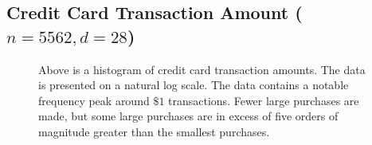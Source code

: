 \documentclass[smallextended,final]{svjour3}       %
\begin{document}
\subsection{Credit Card Transaction Amount ($n = 5562, d = 28$)}

\begin{figure}
  \centering
  \caption{Above is a histogram of credit card transaction
    amounts. The data is presented on a natural log scale. The data
    contains a notable frequency peak around $\$1$ transactions. Fewer
    large purchases are made, but some large purchases are in excess
    of five orders of magnitude greater than the smallest purchases.}
  \label{fig:hist-credit-card}
\end{figure}
\end{document}
